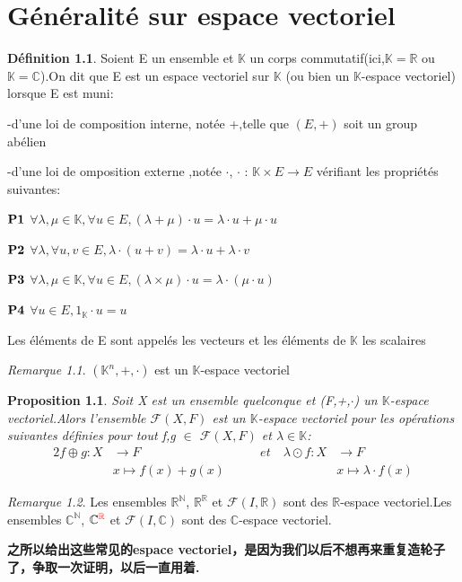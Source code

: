 \documentclass[12pt]{book}
\theoremstyle{definition}\newtheorem{dfn}{Définition}[chapter]
\theoremstyle{plain}\newtheorem{thm}{Théorème}[chapter]
\theoremstyle{plain}\newtheorem{prp}{Proposition}[chapter]
\theoremstyle{plain}\newtheorem{lem}{\bf Lemme}[chapter]
\theoremstyle{plain}\newtheorem{axm}{\bf Axiome}[chapter]
\theoremstyle{plain}\newtheorem{lmm}{\bf Lemme}[chapter]
\theoremstyle{plain}\newtheorem{exm}{\bf Example}[chapter]
\theoremstyle{plain}\newtheorem{cor}{\bf Corollaire}[chapter]
\theoremstyle{remark}\newtheorem{rem}{Remarque}[chapter]
\begin{document}
\chapter{Généralité sur espace vectoriel}
\begin{dfn}
        Soient E un ensemble et $\mathbb{K}$ un corps commutatif(ici,$\mathbb{K}=\mathbb{R}$ ou $\mathbb{K}=\mathbb{C}$).On dit que E est un espace vectoriel sur $\mathbb{K}$
(ou bien un $\mathbb{K}$-espace vectoriel)
lorsque E est muni:

-d'une loi de composition interne, notée +,telle que $(E,+)$ soit un group abélien

-d'une loi de omposition externe ,notée $\cdot$, $\cdot$ : $\mathbb{K}\times E \rightarrow E$ vérifiant les propriétés suivantes:

$\bf P1$ $\forall \lambda,\mu \in \mathbb{K},\forall u\in E ,(\lambda+\mu)\cdot u=\lambda\cdot u+\mu\cdot u$

$\bf P2$ $\forall \lambda,\forall u,v\in E ,\lambda\cdot(u+v)=\lambda\cdot u+\lambda\cdot v$


$\bf P3$ $\forall \lambda,\mu \in \mathbb{K},\forall u\in E ,(\lambda\times\mu)\cdot u=\lambda\cdot(\mu\cdot u)$

$\bf P4$ $\forall u\in E ,1_{\mathbb{K}}\cdot u=u$

Les éléments de E sont appelés les vecteurs et les éléments de $\mathbb{K}$ les scalaires
\end{dfn}
\begin{rem}
$(\mathbb{K}^n,+,\cdot)$ est un $\mathbb{K}$-espace vectoriel
\end{rem}
\begin{prp}
        Soit X est un ensemble {\color{red}quelconque} et (F,+,$\cdot$) un $\mathbb{K}$-espace vectoriel.Alors l'ensemble $\mathcal{F}(X,F)$ est un $\mathbb{K}$-espace vectoriel pour les opérations suivantes définies pour tout f,g $\in$ $\mathcal{F}(X,F)$ et $\lambda\in \mathbb{K}$:
\begin{alignat*}{2}
        f\oplus g: X&\rightarrow F&\qquad et \quad \lambda\odot f: X&\rightarrow F\\&x\mapsto f(x)+g(x)
&\quad &x\mapsto \lambda\cdot f(x)
        \end{alignat*}
\end{prp}
\begin{rem}
        Les ensembles $\mathbb{R}^{\mathbb{N}}$,
$\mathbb{R}^{\mathbb{R}}$ et $\mathcal{F}(I,\mathbb{R})$ sont des $\mathbb{R}$-espace vectoriel.Les ensembles $\mathbb{C}^{\mathbb{N}}$,
$\mathbb{C}^{\color{red}\mathbb{R}}$ et $\mathcal{F}(I,\mathbb{C})$ sont des $\mathbb{C}$-espace vectoriel.
\end{rem}
\textbf{之所以给出这些常见的espace vectoriel，是因为我们以后不想再来重复造轮子了，争取一次证明，以后一直用着.}
\end{document}

